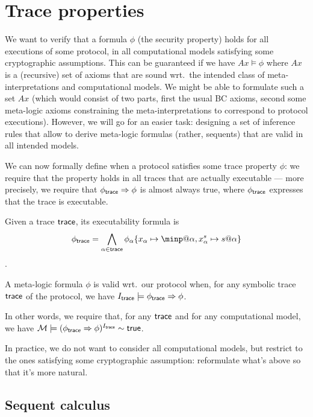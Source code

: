 \section{Trace properties}

We want to verify that a formula $\phi$ (the security property)
holds for all executions of some protocol, in all computational models
satisfying some cryptographic assumptions.
This can be guaranteed if we have $Ax\models\phi$
where $Ax$ is a (recursive) set of axioms that are sound
wrt.\ the intended class of meta-interpretations and computational models.
We might be able to formulate such a set $Ax$ (which would consist of
two parts, first the usual BC axioms, second some meta-logic axioms
constraining the meta-interpretations to correspond to protocol executions).
However, we will go for an easier task: designing a set of inference
rules that allow to derive meta-logic formulas (rather, sequents)
that are valid in all intended models.


We can now formally define when a protocol satisfies some trace property
$\phi$:
we require that the property holds in all traces that are actually executable
--- more precisely, we require that $\phi_{\textsf{trace}} \Rightarrow \phi$ is almost
always true, where $\phi_{\textsf{trace}}$ expresses that the trace is executable.

\begin{definition}
  Given a trace $\textsf{trace}$, its executability formula is
  $$\phi_\tr = \bigwedge_{\alpha\in\tr}
  \phi_\alpha\{x_\alpha\mapsto\minp@\alpha,x^s_\alpha\mapsto s@\alpha\}$$.
\end{definition}

\begin{definition}
  A meta-logic formula $\phi$ is valid wrt.\ our protocol when,
  for any symbolic trace $\textsf{trace}$ of the protocol,
  we have $I_{\textsf{trace}} \models \phi_{\textsf{trace}} \Rightarrow \phi$.
\end{definition}

In other words, we require that, for any $\textsf{trace}$ and
for any computational model,
we have $\mathcal{M} \models (\phi_{\textsf{trace}}\Rightarrow\phi)^{I_{\textsf{trace}}} \sim \textsf{true}$.

In practice, we do not want to consider all computational models, but
restrict to the ones satisfying some cryptographic assumption: reformulate
what's above so that it's more natural.

\subsection{Sequent calculus}

